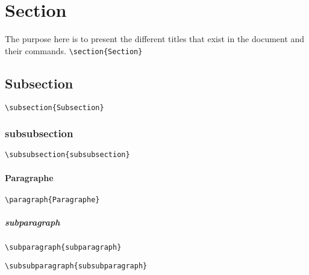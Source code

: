 \section{Section}
The purpose here is to present the different titles that exist in the document
and their commands. \newline
\verb=\section{Section}= \newline

\lipsum[1]

\subsection{Subsection}

\verb=\subsection{Subsection}= \newline

\lipsum[2]

\subsubsection{subsubsection}

\verb=\subsubsection{subsubsection}= \newline

\lipsum[3]

\paragraph{Paragraphe}

\verb=\paragraph{Paragraphe}= \newline

\lipsum[4]

\subparagraph{subparagraph}

\verb=\subparagraph{subparagraph}= \newline

\lipsum[5]


\verb=\subsubparagraph{subsubparagraph}= \newline

\lipsum[6]